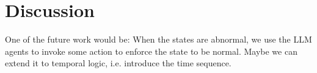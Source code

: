 \section{Discussion}   

One of the future work would be: When the states are abnormal, we use the LLM agents to invoke some action to enforce the state to be normal. Maybe we can extend it to temporal logic, i.e. introduce the time sequence.